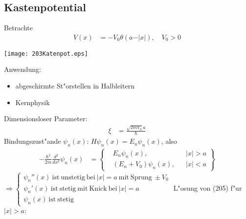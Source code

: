 \documentclass[a4paper]{scrartcl}
\begin{document}
{\subsection{Kastenpotential}
Betrachte
\begin{align}
V(x) & = - V_0 \theta(a - \vert x \vert), \quad V_0 > 0
\end{align}
\begin{center}
\texttt{[image: 203Katenpot.eps]}
\end{center}
Anwendung:
\begin{itemize}
\item abgeschirmte St"orstellen in Halbleitern
\item Kernphysik
\end{itemize}
Dimensionsloser Parameter:
\begin{align}
\xi & = \frac{\sqrt{2 m V_0} a}{\hbar}
\end{align}
Bindungszust"ande $\psi_n(x)$: $H \psi_n(x) = E_n \psi_n(x)$, also 
\begin{align}
- \frac{ \hbar^2}{2m} \frac{d^2}{dx^2} \psi_n(x) & = \left\{ \begin{aligned} & E_n \psi_n(x), && \vert x \vert > a \\ & (E_n + V_0) \psi_n(x), && \vert x \vert < a \end{aligned} \right\}
\end{align}
$\Longrightarrow \begin{cases} \psi_n''(x) \mathrm{ \ ist \ unstetig \ bei \ } \vert x \vert = a \mathrm{ \ mit \ Sprung \ } \pm V_0 \\
\psi_n'(x) \mathrm{ \ ist \ stetig \ mit \ Knick \ bei \ } \vert x \vert = a \\ \psi_n(x) \mathrm{ \ ist \ stetig} \end{cases}$
L"osung von (205) f"ur $\vert x \vert > a$:

}
\end{document}
